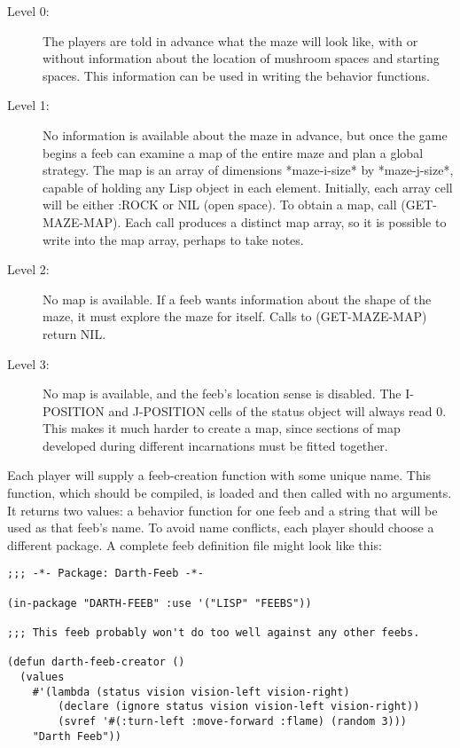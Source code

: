 \documentclass[12pt]{article}
\begin{document}
\begin{description}

\item[Level 0:] The players are told in advance what the maze will
look like, with or without information about the location of mushroom
spaces and starting spaces.  This information can be used in writing
the behavior functions.

\item[Level 1:] No information is available about the maze in advance,
but once the game begins a feeb can examine a map of the entire maze
and plan a global strategy.  The map is an array of dimensions
*maze-i-size* by *maze-j-size*, capable of holding any Lisp object in
each element.  Initially, each array cell will be either :ROCK or NIL
(open space).  To obtain a map, call (GET-MAZE-MAP).  Each call
produces a distinct map array, so it is possible to write into the map
array, perhaps to take notes.

\item[Level 2:] No map is available.  If a feeb wants information
about the shape of the maze, it must explore the maze for itself.
Calls to (GET-MAZE-MAP) return NIL.

\item[Level 3:] No map is available, and the feeb's location sense is
disabled.  The I-POSITION and J-POSITION cells of the status object
will always read 0.  This makes it much harder to create a map, since
sections of map developed during different incarnations must be fitted
together.

\end{description}

Each player will supply a feeb-creation function with some unique
name.  This function, which should be compiled, is loaded and then
called with no arguments.  It returns two values: a behavior function
for one feeb and a string that will be used as that feeb's name.  To
avoid name conflicts, each player should choose a different package.
A complete feeb definition file might look like this:

\begin {verbatim}
;;; -*- Package: Darth-Feeb -*-

(in-package "DARTH-FEEB" :use '("LISP" "FEEBS"))

;;; This feeb probably won't do too well against any other feebs.

(defun darth-feeb-creator ()
  (values
    #'(lambda (status vision vision-left vision-right)
        (declare (ignore status vision vision-left vision-right))
        (svref '#(:turn-left :move-forward :flame) (random 3)))
    "Darth Feeb"))

\end{verbatim}
\end{document}
